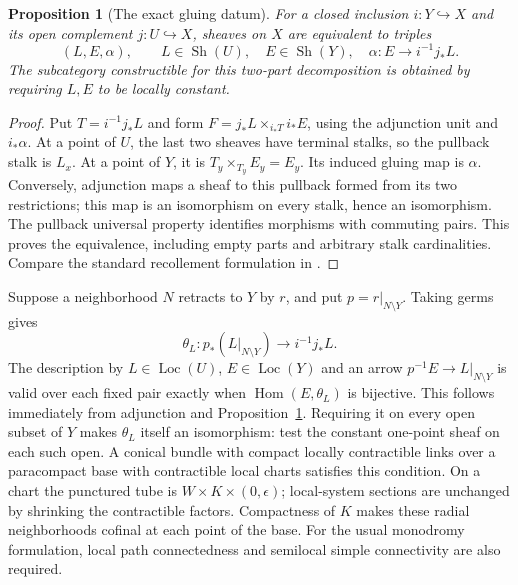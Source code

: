 \documentclass[11pt,a4paper]{article}
\newtheorem{proposition}[theorem]{Proposition}
\theoremstyle{definition}
\newcommand{\Sh}{\operatorname{Sh}}
\begin{document}
\begin{proposition}[The exact gluing datum]\label{prop:recollement}
For a closed inclusion $i:Y\hookrightarrow X$ and its open complement
$j:U\hookrightarrow X$, sheaves on $X$ are equivalent to triples
\[
 (L,E,\alpha),\qquad L\in\Sh(U),\quad E\in\Sh(Y),\quad
 \alpha:E\longrightarrow i^{-1}j_*L.
\]
The subcategory constructible for this two-part decomposition is
obtained by requiring $L,E$ to be locally constant.
\end{proposition}
\begin{proof}
Put $T=i^{-1}j_*L$ and form
$F=j_*L\times_{i_*T}i_*E$, using the adjunction unit and $i_*\alpha$.
At a point of $U$, the last two sheaves have terminal stalks, so the
pullback stalk is $L_x$. At a point of $Y$, it is
$T_y\times_{T_y}E_y=E_y$. Its induced gluing map is $\alpha$.
Conversely, adjunction maps a sheaf to this pullback formed from its
two restrictions; this map is an isomorphism on every stalk, hence
an isomorphism. The pullback universal property identifies morphisms
with commuting pairs. This proves the equivalence, including empty
parts and arbitrary stalk cardinalities. Compare the standard
recollement formulation in \cite[Example~A.8.4]{Lurie}.
\end{proof}

Suppose a neighborhood $N$ retracts to $Y$ by $r$, and put
$p=r|_{N\setminus Y}$. Taking germs gives
\[
 \theta_L:p_*(L|_{N\setminus Y})\longrightarrow i^{-1}j_*L.
\]
The description by $L\in\operatorname{Loc}(U)$,
$E\in\operatorname{Loc}(Y)$ and an arrow
$p^{-1}E\to L|_{N\setminus Y}$ is valid over each fixed pair exactly
when $\operatorname{Hom}(E,\theta_L)$ is bijective. This follows
immediately from adjunction and Proposition~\ref{prop:recollement}.
Requiring it on every open subset of $Y$ makes $\theta_L$ itself an
isomorphism: test the constant one-point sheaf on each such open.
A conical bundle with compact locally contractible links over a
paracompact base with contractible local charts satisfies this condition.
On a chart the punctured tube is $W\times K\times(0,\epsilon)$;
local-system sections are unchanged by shrinking the contractible
factors. Compactness of $K$ makes these radial neighborhoods cofinal
at each point of the base. For the usual monodromy formulation,
local path connectedness and semilocal simple connectivity are also
required.
\end{document}
